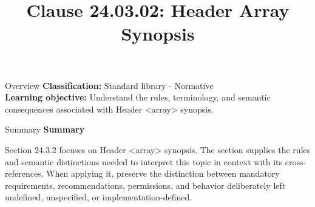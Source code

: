 \documentclass[10pt,letterpaper]{article}
\title{Clause 24.03.02: Header Array Synopsis}
\author{}
\date{}
\begin{document}
\maketitle
\begin{CornellOverviewBox}{Overview}
\textbf{Classification:} Standard library - Normative\\[2pt]
\textbf{Learning objective:} Understand the rules, terminology, and semantic consequences associated with Header <array> synopsis.
\end{CornellOverviewBox}\begin{CornellSummaryBox}{Summary}
{\sffamily\bfseries\color{Accent} Summary}\par\vspace{3pt}Section 24.3.2 focuses on Header <array> synopsis. The section supplies the rules and semantic distinctions needed to interpret this topic in context with its cross-references. When applying it, preserve the distinction between mandatory requirements, recommendations, permissions, and behavior deliberately left undefined, unspecified, or implementation-defined.
\end{CornellSummaryBox}
\end{document}
